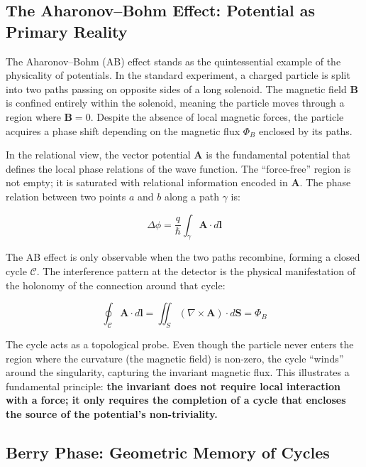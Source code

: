 \subsection{The Aharonov--Bohm Effect: Potential as Primary Reality}\label{sec:aharonov_bohm}

The Aharonov--Bohm (AB) effect stands as the quintessential example of the physicality of potentials. In the standard experiment, a charged particle is split into two paths passing on opposite sides of a long solenoid. The magnetic field $\mathbf{B}$ is confined entirely within the solenoid, meaning the particle moves through a region where $\mathbf{B} = 0$. Despite the absence of local magnetic forces, the particle acquires a phase shift depending on the magnetic flux $\Phi_B$ enclosed by its paths.

In the relational view, the vector potential $\mathbf{A}$ is the fundamental potential that defines the local phase relations of the wave function. The ``force-free'' region is not empty; it is saturated with relational information encoded in $\mathbf{A}$. The phase relation between two points $a$ and $b$ along a path $\gamma$ is:

\begin{equation}
\Delta\phi = \frac{q}{\hbar} \int_\gamma \mathbf{A} \cdot d\mathbf{l}
\end{equation}

The AB effect is only observable when the two paths recombine, forming a closed cycle $\mathcal{C}$. The interference pattern at the detector is the physical manifestation of the holonomy of the connection around that cycle:

\begin{equation}
\oint_\mathcal{C} \mathbf{A} \cdot d\mathbf{l} = \iint_S (\nabla \times \mathbf{A}) \cdot d\mathbf{S} = \Phi_B
\end{equation}

The cycle acts as a topological probe. Even though the particle never enters the region where the curvature (the magnetic field) is non-zero, the cycle ``winds'' around the singularity, capturing the invariant magnetic flux. This illustrates a fundamental principle: \textbf{the invariant does not require local interaction with a force; it only requires the completion of a cycle that encloses the source of the potential's non-triviality.}

\subsection{Berry Phase: Geometric Memory of Cycles}\label{sec:berry_phase}

